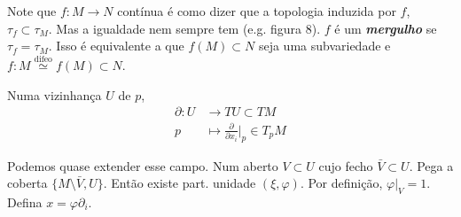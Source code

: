 Note que \(f: M \to N\) contínua é como dizer que a topologia induzida por \(f\), \(\tau_f \subset \tau_M\). Mas a igualdade nem sempre tem (e.g. figura 8). \(f\) é um \textit{\textbf{mergulho }} se \(\tau_f = \tau_M\). Isso é equivalente a que \(f(M) \subset N\) seja uma subvariedade e \(f:M \overset{\operatorname{difeo}}{\simeq}f(M)\subset N\).

\begin{defn}\leavevmode
Numa vizinhança \(U\) de \(p\),
\begin{align*}
	\partial : U &\longrightarrow TU\subset TM \\
	p &\longmapsto \frac{\partial }{\partial x_i}\Big|_{p}\in T_pM
\end{align*}
\end{defn}

\begin{remark}\leavevmode
Podemos quase extender esse campo. Num aberto \(V \subset U\) cujo fecho \(\bar{V} \subset U\). Pega a coberta \(\{ M \setminus \bar{V}, U\}\). Então existe part. unidade  \((\xi,\varphi)\). Por definição, \(\varphi|_{V} =1\). Defina \(x= \varphi \partial_i\).
\end{remark}

